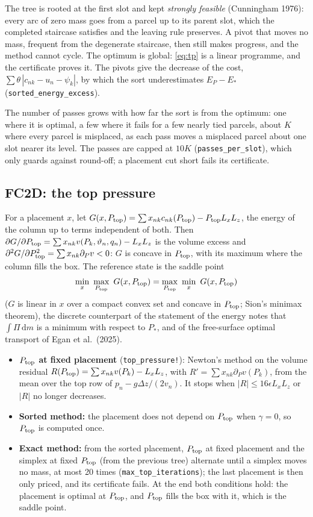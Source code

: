 \documentclass[11pt,a4paper]{article}
\newcommand{\vt}{\vartheta}
\newcommand{\code}[1]{\texttt{#1}}
\newcommand{\Ptop}{P_{\rm top}}
\begin{document}
The tree is rooted at the first slot and kept \emph{strongly feasible} (Cunningham 1976): every arc of zero mass goes from a
parcel up to its parent slot, which the completed staircase satisfies and the leaving rule preserves. A pivot that moves no
mass, frequent from the degenerate staircase, then still makes progress, and the method cannot cycle. The optimum is global:
\eqref{eq:tp} is a linear programme, and the certificate proves it. The pivots give the decrease of the cost,
$\sum\theta\,|c_{nk}-u_n-\psi_k|$, by which the sort underestimates $E_P-E_*$ (\code{sorted\_energy\_excess}).

The number of passes grows with how far the sort is from the optimum: one where it is optimal, a few where it fails for a few
nearly tied parcels, about $K$ where every parcel is misplaced, as each pass moves a misplaced parcel about one slot nearer its
level. The passes are capped at $10K$ (\code{passes\_per\_slot}), which only guards against round-off; a placement cut short
fails its certificate.

\subsection{FC2D: the top pressure}\label{sec:fc}
For a placement $x$, let $G(x,\Ptop)=\sum x_{nk}c_{nk}(\Ptop)-\Ptop L_xL_z$, the energy of the column up to terms independent
of both. Then $\partial G/\partial\Ptop=\sum x_{nk}v(P_k,\vt_n,q_n)-L_xL_z$ is the volume excess and
$\partial^2G/\partial\Ptop^2=\sum x_{nk}\partial_Pv<0$: $G$ is concave in $\Ptop$, with its maximum where the column fills the
box. The reference state is the saddle point
\begin{equation}
  \min_x\ \max_{\Ptop}\ G(x,\Ptop)=\max_{\Ptop}\ \min_x\ G(x,\Ptop)
  \label{eq:saddle}
\end{equation}
($G$ is linear in $x$ over a compact convex set and concave in $\Ptop$; Sion's minimax theorem), the discrete counterpart of
the statement of the energy notes that $\int\Pi\,\mathrm{d}m$ is a minimum with respect to $P_*$, and of the free-surface
optimal transport of Egan et al.\ (2025).
\begin{itemize}
  \item \textbf{$\Ptop$ at fixed placement} (\code{top\_pressure!}): Newton's method on the volume residual
        $R(\Ptop)=\sum x_{nk}v(P_k)-L_xL_z$, with $R'=\sum x_{nk}\partial_Pv(P_k)$, from the mean over the top row of
        $p_n-g\Delta z/(2v_n)$. It stops when $|R|\le16\epsilon L_xL_z$ or $|R|$ no longer decreases.
  \item \textbf{Sorted method:} the placement does not depend on $\Ptop$ when $\gamma=0$, so $\Ptop$ is computed once.
  \item \textbf{Exact method:} from the sorted placement, $\Ptop$ at fixed placement and the simplex at fixed $\Ptop$ (from the
        previous tree) alternate until a simplex moves no mass, at most 20 times (\code{max\_top\_iterations}); the last
        placement is then only priced, and its certificate fails. At the end both conditions hold: the placement is optimal
        at $\Ptop$, and $\Ptop$ fills the box with it, which is the saddle point.
\end{itemize}
\end{document}
